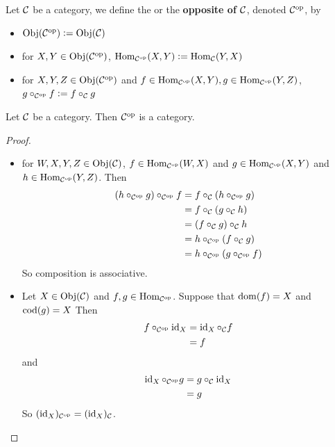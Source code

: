 \documentclass{book}
\begin{document}
	\begin{defn}  
		Let $\MC$ be a category, we define the  or the \textbf{opposite of $\MC$}, denoted $\op{\MC}$, by 
		\begin{itemize}
			\item $\Obj(\op{\MC}) \defeq \Obj(\MC)$
			\item for $X,Y \in \Obj(\op{\MC})$, $\Hom_{\op{\MC}}(X,Y) \defeq \Hom_{\MC}(Y,X)$
			\item for $X, Y, Z \in \Obj(\op{\MC})$ and $f \in \Hom_{\op{\MC}}(X, Y), g \in \Hom_{\op{\MC}}(Y,Z)$, $g \circ_{\op{\MC}} f \defeq f \circ_{\MC} g$
		\end{itemize}
	\end{defn}

	\begin{ex}  
		Let $\MC$ be a category. Then $\op{\MC}$ is a category.
	\end{ex}
	
	\begin{proof}\
		\begin{itemize}
			\item for $W,X,Y,Z \in \Obj(\MC)$, $f \in \Hom_{\op{\MC}}(W, X)$ and $g \in \Hom_{\op{\MC}}(X, Y)$ and $h \in \Hom_{\op{\MC}}(Y, Z)$. Then 
			\begin{align*}
				(h \circ_{\op{\MC}} g) \circ_{\op{\MC}} f 
				&= f \circ_{\MC}( h \circ_{\op{\MC}} g) \\
				&= f \circ_{\MC} (g \circ_{\MC} h) \\
				&= (f \circ_{\MC} g) \circ_{\MC} h \\
				&= h \circ_{\op{\MC}} (f \circ_{\MC} g) \\
				&= h \circ_{\op{\MC}} (g \circ_{\op{\MC}} f)
			\end{align*}
			So composition is associative.
			\item Let $X \in \Obj(\MC)$ and $f,g \in \Hom_{\op{\MC}}$. Suppose that $\dom(f) = X$ and $\cod(g) = X$ 
			Then 
			\begin{align*}
				f  \circ_{\op{\MC}} \id_X
				&= \id_X  \circ_{\MC} f \\
				&= f
			\end{align*}
			and 
			\begin{align*}
				\id_X  \circ_{\op{\MC}} g 
				&= g \circ_{\MC} \id_X \\
				&= g
			\end{align*}
		So $(\id_X)_{\op{\MC}} =  (\id_X)_{\MC}$.
		\end{itemize}
	\end{proof}
	
\end{document}
